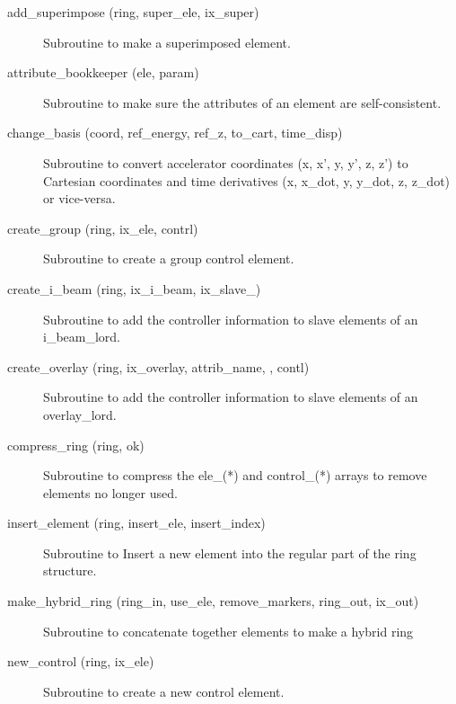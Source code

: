 \begin{description}

\item[add\_superimpose (ring, super\_ele, ix\_super)] \Newline
Subroutine to make a superimposed element. 

\item[attribute\_bookkeeper (ele, param)] \Newline
Subroutine to make sure the attributes of an element are self-consistent. 

\item[change\_basis (coord, ref\_energy, ref\_z, to\_cart, time\_disp)] \Newline
Subroutine to convert accelerator coordinates (x, x', y, y', z, z') to
Cartesian coordinates and time derivatives (x, x\_dot, y, y\_dot, z,
z\_dot) or vice-versa.

\item[create\_group (ring, ix\_ele, contrl)] \Newline
Subroutine to create a group control element. 

\item[create\_i\_beam (ring, ix\_i\_beam, ix\_slave\_)] \Newline 
     Subroutine to add the controller information to slave elements of
     an i\_beam\_lord.

\item[create\_overlay (ring, ix\_overlay, attrib\_name, , contl)] \Newline
Subroutine to add the controller information to slave elements of an 
overlay\_lord. 

\item[compress\_ring (ring, ok)] \Newline
Subroutine to compress the ele\_(*) and control\_(*) arrays to remove
elements no longer used.

\item[insert\_element (ring, insert\_ele, insert\_index)] \Newline
Subroutine to Insert a new element into the regular part of the 
ring structure. 

\item[make\_hybrid\_ring (ring\_in, use\_ele, remove\_markers, ring\_out, ix\_out)] \Newline
Subroutine to concatenate together elements to make a hybrid ring 

\item[new\_control (ring, ix\_ele)] \Newline
Subroutine to create a new control element. 


\end{description}
